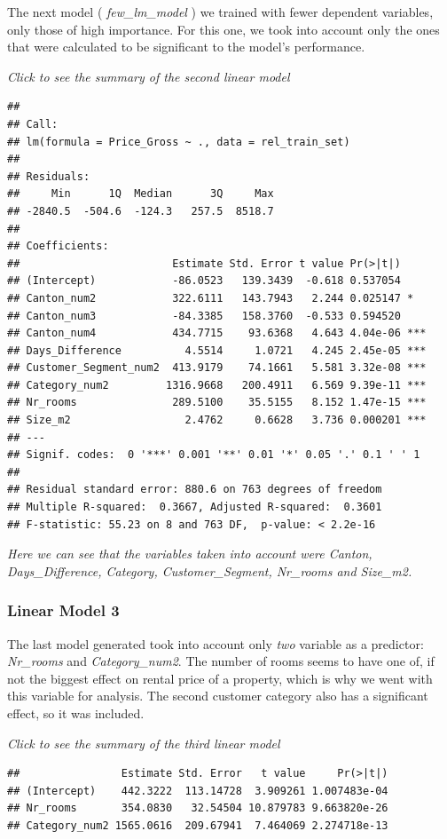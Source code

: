 \documentclass[
]{article}
\begin{document}
The next model ( \emph{few\_lm\_model} ) we trained with fewer dependent
variables, only those of high importance. For this one, we took into
account only the ones that were calculated to be significant to the
model's performance.

\emph{Click to see the summary of the second linear model}

\begin{verbatim}
## 
## Call:
## lm(formula = Price_Gross ~ ., data = rel_train_set)
## 
## Residuals:
##     Min      1Q  Median      3Q     Max 
## -2840.5  -504.6  -124.3   257.5  8518.7 
## 
## Coefficients:
##                        Estimate Std. Error t value Pr(>|t|)    
## (Intercept)            -86.0523   139.3439  -0.618 0.537054    
## Canton_num2            322.6111   143.7943   2.244 0.025147 *  
## Canton_num3            -84.3385   158.3760  -0.533 0.594520    
## Canton_num4            434.7715    93.6368   4.643 4.04e-06 ***
## Days_Difference          4.5514     1.0721   4.245 2.45e-05 ***
## Customer_Segment_num2  413.9179    74.1661   5.581 3.32e-08 ***
## Category_num2         1316.9668   200.4911   6.569 9.39e-11 ***
## Nr_rooms               289.5100    35.5155   8.152 1.47e-15 ***
## Size_m2                  2.4762     0.6628   3.736 0.000201 ***
## ---
## Signif. codes:  0 '***' 0.001 '**' 0.01 '*' 0.05 '.' 0.1 ' ' 1
## 
## Residual standard error: 880.6 on 763 degrees of freedom
## Multiple R-squared:  0.3667, Adjusted R-squared:  0.3601 
## F-statistic: 55.23 on 8 and 763 DF,  p-value: < 2.2e-16
\end{verbatim}

\emph{Here we can see that the variables taken into account were Canton,
Days\_Difference, Category, Customer\_Segment, Nr\_rooms and Size\_m2.}

\subsubsection{Linear Model 3}\label{linear-model-3}

The last model generated took into account only \emph{two} variable as a
predictor: \emph{Nr\_rooms} and \emph{Category\_num2}. The number of
rooms seems to have one of, if not the biggest effect on rental price of
a property, which is why we went with this variable for analysis. The
second customer category also has a significant effect, so it was
included.

\emph{Click to see the summary of the third linear model}

\begin{verbatim}
##                Estimate Std. Error   t value     Pr(>|t|)
## (Intercept)    442.3222  113.14728  3.909261 1.007483e-04
## Nr_rooms       354.0830   32.54504 10.879783 9.663820e-26
## Category_num2 1565.0616  209.67941  7.464069 2.274718e-13
\end{verbatim}
\end{document}

